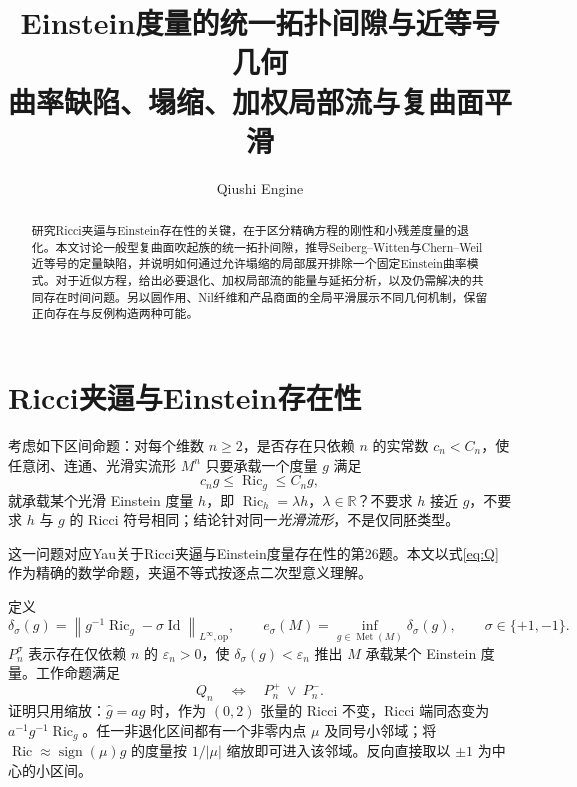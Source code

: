 \documentclass[UTF8,a4paper,11pt,fontset=fandol]{ctexart}
\title{Einstein度量的统一拓扑间隙与近等号几何\\[0.5em]{\large 曲率缺陷、塌缩、加权局部流与复曲面平滑}}
\author{Qiushi Engine}
\date{}
\numberwithin{equation}{section}
\theoremstyle{definition}
\newcommand{\Ric}{\operatorname{Ric}}
\newcommand{\Met}{\operatorname{Met}}
\newcommand{\Id}{\operatorname{Id}}
\newcommand{\op}{\mathrm{op}}
\newcommand{\R}{\mathbb R}
\newcommand{\norm}[1]{\left\lVert#1\right\rVert}
\begin{document}
\maketitle
\begin{abstract}
研究Ricci夹逼与Einstein存在性的关键，在于区分精确方程的刚性和小残差度量的退化。本文讨论一般型复曲面吹起族的统一拓扑间隙，推导Seiberg--Witten与Chern--Weil近等号的定量缺陷，并说明如何通过允许塌缩的局部展开排除一个固定Einstein曲率模式。对于近似方程，给出必要退化、加权局部流的能量与延拓分析，以及仍需解决的共同存在时间问题。另以圆作用、Nil纤维和产品商面的全局平滑展示不同几何机制，保留正向存在与反例构造两种可能。
\end{abstract}
\begingroup
\small\linespread{1.0}\selectfont\setlength{\parskip}{0pt}
\tableofcontents
\endgroup
\clearpage

\section{Ricci夹逼与Einstein存在性}
考虑如下区间命题：对每个维数 $n\ge2$，是否存在只依赖 $n$ 的实常数 $c_n<C_n$，使任意闭、连通、光滑实流形 $M^n$ 只要承载一个度量 $g$ 满足
\begin{equation}\label{eq:Q}
 c_ng\le\Ric_g\le C_ng,
\end{equation}
就承载某个光滑 Einstein 度量 $h$，即 $\Ric_h=\lambda h$，$\lambda\in\R$？不要求 $h$ 接近 $g$，不要求 $h$ 与 $g$ 的 Ricci 符号相同；结论针对同一\emph{光滑流形}，不是仅同胚类型。

这一问题对应Yau关于Ricci夹逼与Einstein度量存在性的第26题\cite{Yau1982}。本文以式\eqref{eq:Q}作为精确的数学命题，夹逼不等式按逐点二次型意义理解。

定义
\begin{equation}\label{eq:defect}
 \delta_\sigma(g)=\norm{g^{-1}\Ric_g-\sigma\Id}_{L^\infty,\op},\qquad
 e_\sigma(M)=\inf_{g\in\Met(M)}\delta_\sigma(g),\qquad \sigma\in\{+1,-1\}.
\end{equation}
$P_n^\sigma$ 表示存在仅依赖 $n$ 的 $\varepsilon_n>0$，使 $\delta_\sigma(g)<\varepsilon_n$ 推出 $M$ 承载某个 Einstein 度量。工作命题满足
\begin{equation}\label{eq:branches}
 Q_n\quad\Longleftrightarrow\quad P_n^+\ \lor\ P_n^-.
\end{equation}
证明只用缩放：$\widehat g=ag$ 时，作为 $(0,2)$ 张量的 Ricci 不变，Ricci 端同态变为 $a^{-1}g^{-1}\Ric_g$。任一非退化区间都有一个非零内点 $\mu$ 及同号小邻域；将 $\Ric\approx\operatorname{sign}(\mu)g$ 的度量按 $1/|\mu|$ 缩放即可进入该邻域。反向直接取以 $\pm1$ 为中心的小区间。
\end{document}
